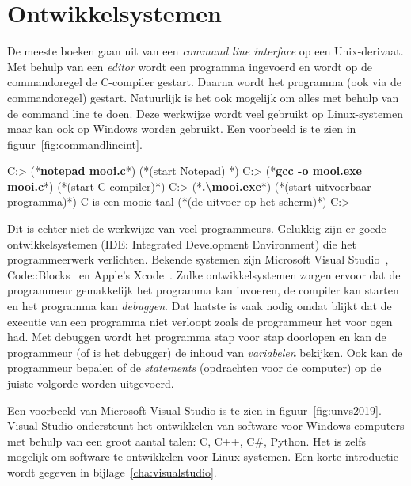 \section{Ontwikkelsystemen}
De meeste boeken gaan uit van een \textsl{command line interface} op een Unix-derivaat. Met behulp van een \textsl{editor} wordt een programma ingevoerd en wordt op de commandoregel de C-compiler gestart. Daarna wordt het programma (ook via de commandoregel) gestart.
Natuurlijk is het ook mogelijk om alles met behulp van de command line te doen. Deze werkwijze wordt veel gebruikt op Linux-systemen maar kan ook op Windows worden gebruikt. Een voorbeeld is te zien in figuur~\ref{fig:commandlineint}.

\begin{dosbox}[title=Een voorbeeld van een command line interface.,label=fig:commandlineint]
C:\Users\C> (*\textbf{notepad mooi.c}*) (*\hfill\textrm{(start Notepad)} *)
C:\Users\C> (*\textbf{gcc -o mooi.exe mooi.c}*) (*\hfill\textrm{(start C-compiler)}*)
C:\Users\C> (*\textbf{.\textbackslash mooi.exe}*) (*\hfill\textrm{(start uitvoerbaar programma)}*)
C is een mooie taal (*\hfill\textrm{(de uitvoer op het scherm)}*)
C:\Users\C>
\end{dosbox}

Dit is echter niet de werkwijze van veel programmeurs. Gelukkig zijn er goede ontwikkelsystemen (IDE: Integrated Development Environment) die het programmeerwerk verlichten. Bekende systemen zijn Microsoft Visual Studio~\cite{vs2019}, Code::Blocks~\cite{codeblocks2020} en Apple's Xcode~\cite{xcode2020}.
Zulke ontwikkelsystemen zorgen ervoor dat de programmeur gemakkelijk het programma kan invoeren, de compiler kan starten en het programma kan \textsl{debuggen}. Dat laatste is vaak nodig omdat blijkt dat de executie van een programma niet verloopt zoals de programmeur het voor ogen had. Met debuggen wordt het programma stap voor stap doorlopen en kan de programmeur (of is het debugger) de inhoud van \textsl{variabelen} bekijken. Ook kan de programmeur bepalen of de \textsl{statements} (opdrachten voor de computer) op de juiste volgorde worden uitgevoerd.

Een voorbeeld van Microsoft Visual Studio is te zien in figuur~\ref{fig:unvs2019}. Visual Studio ondersteunt het ontwikkelen van software voor Windows-computers met behulp van een groot aantal talen: C, C++, C\#, Python. Het is zelfs mogelijk om software te ontwikkelen voor Linux-systemen. Een korte introductie wordt gegeven in bijlage~\ref{cha:visualstudio}.

